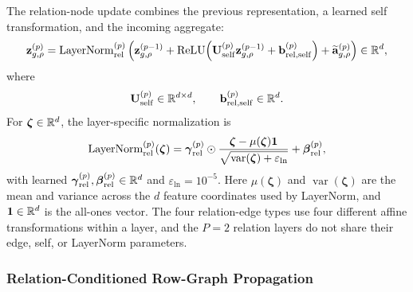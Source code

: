 The relation-node update combines the previous representation, a learned
self transformation, and the incoming aggregate:
\begin{equation}
  \mathbf z_{g,\rho}^{(p)}
  =
  \operatorname{LayerNorm}_{\mathrm{rel}}^{(p)}
  \left(
    \mathbf z_{g,\rho}^{(p-1)}
    +\operatorname{ReLU}\!\left(
      \mathbf U_{\mathrm{self}}^{(p)}
      \mathbf z_{g,\rho}^{(p-1)}
      +\mathbf b_{\mathrm{rel},\mathrm{self}}^{(p)}
    \right)
    +\widetilde{\mathbf a}_{g,\rho}^{(p)}
  \right)
  \in\mathbb{R}^d,
\label{eq:method:relation-update}
\end{equation}
where
\begin{equation}
  \mathbf U_{\mathrm{self}}^{(p)}\in\mathbb{R}^{d\times d},
  \qquad
  \mathbf b_{\mathrm{rel},\mathrm{self}}^{(p)}\in\mathbb{R}^d.
\label{eq:method:relation-self-parameter-domains}
\end{equation}
For \(\boldsymbol\zeta\in\mathbb{R}^d\), the layer-specific normalization is
\begin{equation}
  \operatorname{LayerNorm}_{\mathrm{rel}}^{(p)}(\boldsymbol\zeta)
  =
  \boldsymbol\gamma_{\mathrm{rel}}^{(p)}\odot
  \frac{
    \boldsymbol\zeta-\mu(\boldsymbol\zeta)\mathbf1
  }{
    \sqrt{\operatorname{var}(\boldsymbol\zeta)+\varepsilon_{\mathrm{ln}}}
  }
  +\boldsymbol\beta_{\mathrm{rel}}^{(p)},
\label{eq:method:relation-layernorm}
\end{equation}
with learned
\(\boldsymbol\gamma_{\mathrm{rel}}^{(p)},
\boldsymbol\beta_{\mathrm{rel}}^{(p)}\in\mathbb{R}^d\) and
\(\varepsilon_{\mathrm{ln}}=10^{-5}\). Here
\(\mu(\boldsymbol\zeta)\) and
\(\operatorname{var}(\boldsymbol\zeta)\) are the mean and variance across
the \(d\) feature coordinates used by LayerNorm, and
\(\mathbf1\in\mathbb{R}^d\) is the
all-ones vector. The four relation-edge types use
four different affine transformations within a layer, and the \(P=2\)
relation layers do not share their edge, self, or LayerNorm parameters.

\subsubsection{Relation-Conditioned Row-Graph Propagation}
\label{sec:method:row-propagation}

